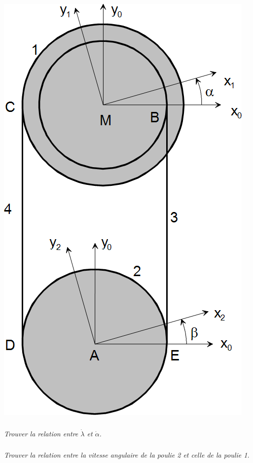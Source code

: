 \documentclass[10pt]{article}
\begin{document}
\begin{minipage}[c]{.3\linewidth}
\begin{center}
\includegraphics[width=.8\textwidth]{images/treuil_1}
\end{center}
\end{minipage}
\subparagraph{}
\textit{Trouver la relation entre $\dot{\lambda}$ et $\dot{\alpha}$.}

\subparagraph{}
\textit{Trouver la relation entre la vitesse angulaire de la poulie 2 et celle de la poulie 1.}

\vspace{.25cm}
\end{document}
